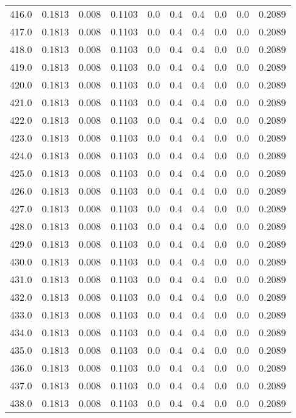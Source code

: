 \begin{longtable}{lrrrrrrrrr}
416.0 & 0.1813 & 0.008 & 0.1103 & 0.0 & 0.4 & 0.4 & 0.0 & 0.0 & 0.2089 \\
417.0 & 0.1813 & 0.008 & 0.1103 & 0.0 & 0.4 & 0.4 & 0.0 & 0.0 & 0.2089 \\
418.0 & 0.1813 & 0.008 & 0.1103 & 0.0 & 0.4 & 0.4 & 0.0 & 0.0 & 0.2089 \\
419.0 & 0.1813 & 0.008 & 0.1103 & 0.0 & 0.4 & 0.4 & 0.0 & 0.0 & 0.2089 \\
420.0 & 0.1813 & 0.008 & 0.1103 & 0.0 & 0.4 & 0.4 & 0.0 & 0.0 & 0.2089 \\
421.0 & 0.1813 & 0.008 & 0.1103 & 0.0 & 0.4 & 0.4 & 0.0 & 0.0 & 0.2089 \\
422.0 & 0.1813 & 0.008 & 0.1103 & 0.0 & 0.4 & 0.4 & 0.0 & 0.0 & 0.2089 \\
423.0 & 0.1813 & 0.008 & 0.1103 & 0.0 & 0.4 & 0.4 & 0.0 & 0.0 & 0.2089 \\
424.0 & 0.1813 & 0.008 & 0.1103 & 0.0 & 0.4 & 0.4 & 0.0 & 0.0 & 0.2089 \\
425.0 & 0.1813 & 0.008 & 0.1103 & 0.0 & 0.4 & 0.4 & 0.0 & 0.0 & 0.2089 \\
426.0 & 0.1813 & 0.008 & 0.1103 & 0.0 & 0.4 & 0.4 & 0.0 & 0.0 & 0.2089 \\
427.0 & 0.1813 & 0.008 & 0.1103 & 0.0 & 0.4 & 0.4 & 0.0 & 0.0 & 0.2089 \\
428.0 & 0.1813 & 0.008 & 0.1103 & 0.0 & 0.4 & 0.4 & 0.0 & 0.0 & 0.2089 \\
429.0 & 0.1813 & 0.008 & 0.1103 & 0.0 & 0.4 & 0.4 & 0.0 & 0.0 & 0.2089 \\
430.0 & 0.1813 & 0.008 & 0.1103 & 0.0 & 0.4 & 0.4 & 0.0 & 0.0 & 0.2089 \\
431.0 & 0.1813 & 0.008 & 0.1103 & 0.0 & 0.4 & 0.4 & 0.0 & 0.0 & 0.2089 \\
432.0 & 0.1813 & 0.008 & 0.1103 & 0.0 & 0.4 & 0.4 & 0.0 & 0.0 & 0.2089 \\
433.0 & 0.1813 & 0.008 & 0.1103 & 0.0 & 0.4 & 0.4 & 0.0 & 0.0 & 0.2089 \\
434.0 & 0.1813 & 0.008 & 0.1103 & 0.0 & 0.4 & 0.4 & 0.0 & 0.0 & 0.2089 \\
435.0 & 0.1813 & 0.008 & 0.1103 & 0.0 & 0.4 & 0.4 & 0.0 & 0.0 & 0.2089 \\
436.0 & 0.1813 & 0.008 & 0.1103 & 0.0 & 0.4 & 0.4 & 0.0 & 0.0 & 0.2089 \\
437.0 & 0.1813 & 0.008 & 0.1103 & 0.0 & 0.4 & 0.4 & 0.0 & 0.0 & 0.2089 \\
438.0 & 0.1813 & 0.008 & 0.1103 & 0.0 & 0.4 & 0.4 & 0.0 & 0.0 & 0.2089 \\

\end{longtable}
